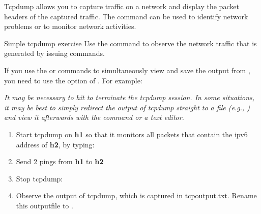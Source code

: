 Tcpdump allows you to capture traffic on a network and display the packet headers of the captured traffic. The  command can be used to identify network problems or to monitor network activities.

\begin{exercise}{Simple tcpdump exercise}\label{ex:tcpdump}
Use the  command to observe the network traffic that is generated by issuing  commands.
\begin{framed}
	If you use the  or  commands to simultaneously view and save the output from , you need to use the  option of . For example:
	\begin{cmdblock}[gobble=2]
	\end{cmdblock}
	\emph{\remark It may be necessary to hit  to terminate the tcpdump session. In some situations, it may be best to simply redirect the output of tcpdump straight to a file (e.g., ) and view it afterwards with the  command or a text editor.}
\end{framed}

\begin{enumerate}
	\item Start tcpdump on \textbf{h1} so that it monitors all packets that contain the \ac{ipv6} address of \textbf{h2}, by typing:
	\begin{cmdblock}[gobble=2]
	\end{cmdblock}
	\item Send 2 pings from \textbf{h1} to \textbf{h2}
	\item Stop tcpdump:
	\begin{cmdblock}[gobble=2]
		\end{cmdblock}
	\item Observe the output of tcpdump, which is captured in tcpoutput.txt. Rename this outputfile to .
\end{enumerate}


\end{exercise}

